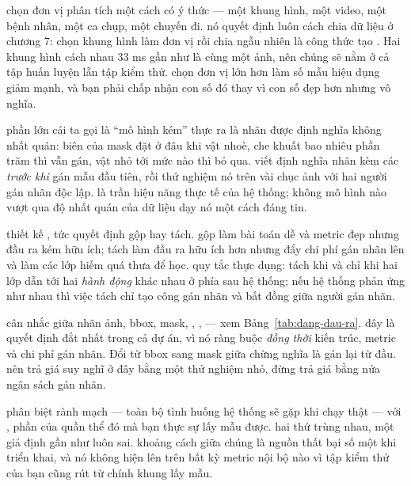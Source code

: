 \documentclass[../../deep_learning.tex]{subfiles}
\begin{document}
\begin{mach}
\item {} \gp chọn đơn vị phân tích một cách có ý thức --- một khung hình, một video, một bệnh nhân, một ca chụp, một chuyến đi. \hq nó quyết định luôn cách chia dữ liệu ở chương 7: chọn khung hình làm đơn vị rồi chia ngẫu nhiên là công thức tạo . Hai khung hình cách nhau \(33\) ms gần như là cùng một ảnh, nên chúng sẽ nằm ở cả tập huấn luyện lẫn tập kiểm thử. \gia chọn đơn vị lớn hơn làm số mẫu hiệu dụng giảm mạnh, và bạn phải chấp nhận con số đó thay vì con số đẹp hơn nhưng vô nghĩa. 
\item {} \gd phần lớn cái ta gọi là ``mô hình kém'' thực ra là nhãn được định nghĩa không nhất quán: biên của mask đặt ở đâu khi vật nhoè, che khuất bao nhiêu phần trăm thì vẫn gán, vật nhỏ tới mức nào thì bỏ qua. \gp viết định nghĩa nhãn kèm các  \emph{trước khi} gán mẫu đầu tiên, rồi thử nghiệm nó trên vài chục ảnh với hai người gán nhãn độc lập. \hq {} là trần hiệu năng thực tế của hệ thống; không mô hình nào vượt qua độ nhất quán của dữ liệu dạy nó một cách đáng tin.
\item {} \gp thiết kế , tức quyết định gộp hay tách. \gia gộp làm bài toán dễ và metric đẹp nhưng đầu ra kém hữu ích; tách làm đầu ra hữu ích hơn nhưng đẩy chi phí gán nhãn lên và làm các lớp hiếm quá thưa để học. \hq quy tắc thực dụng: tách khi và chỉ khi hai lớp dẫn tới hai \emph{hành động} khác nhau ở phía sau hệ thống; nếu hệ thống phản ứng như nhau thì việc tách chỉ tạo công gán nhãn và bất đồng giữa người gán nhãn.
\item {} \gp cân nhắc giữa nhãn ảnh, bbox, mask, , ,  --- xem Bảng~\ref{tab:dang-dau-ra}. \gia đây là quyết định đắt nhất trong cả dự án, vì nó ràng buộc \emph{đồng thời} kiến trúc, metric và chi phí gán nhãn. Đổi từ bbox sang mask giữa chừng nghĩa là gán lại từ đầu. \hq nên trả giá suy nghĩ ở đây bằng một thử nghiệm nhỏ, đừng trả giá bằng nửa ngân sách gán nhãn.
\item {} \gp phân biệt rành mạch  --- toàn bộ tình huống hệ thống sẽ gặp khi chạy thật --- với , phần của quần thể đó mà bạn thực sự lấy mẫu được. \gd hai thứ trùng nhau, một giả định gần như luôn sai. \hq khoảng cách giữa chúng là nguồn thất bại số một khi triển khai, và nó không hiện lên trên bất kỳ metric nội bộ nào vì tập kiểm thử của bạn cũng rút từ chính khung lấy mẫu.

\end{mach}
\end{document}
